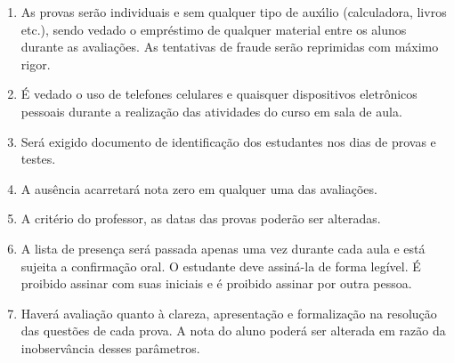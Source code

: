 \documentclass[12pt]{exam}
\begin{document}
\begin{enumerate}[label={\arabic*})]
\item As provas ser\~{a}o individuais e sem qualquer tipo de
aux\'{\i}lio (calculadora, livros etc.), sendo vedado o empr\'{e}stimo de
qualquer material entre os alunos durante as avalia\c{c}\~{o}es. As
tentativas de fraude ser\~{a}o reprimidas com m\'{a}ximo rigor.

\item \'{E} vedado o uso de telefones celulares e quaisquer dispositivos
eletr\^{o}nicos pessoais durante a realiza\c{c}\~{a}o das atividades do curso
em sala de aula.

\item Ser\'{a} exigido documento de identifica\c{c}\~{a}o dos estudantes nos
dias de provas e testes.

\item A aus\^{e}ncia acarretar\'{a} nota zero em qualquer uma das
avalia\c{c}\~{o}es.

\item A crit\'{e}rio do professor, as datas das provas poder\~{a}o
ser alteradas.

\item A lista de presen\c{c}a ser\'{a} passada apenas uma vez
durante cada aula e est\'{a} sujeita a confirma\c{c}\~{a}o oral. O
estudante deve assin\'{a}-la de forma legível. {\'E} proibido assinar
com suas iniciais e \'{e} proibido assinar por outra pessoa.

\item Haver{\'a} avalia{\c c}{\~a}o quanto {\`a} clareza, apresenta{\c
c}{\~a}o e formaliza{\c c}{\~a}o na  resolu{\c c}{\~a}o das quest{\~o}es de
cada prova. A nota do aluno poder{\'a} ser alterada em raz{\~a}o da
inobserv{\^a}ncia desses par{\^a}metros.
\end{enumerate}
\end{document}
